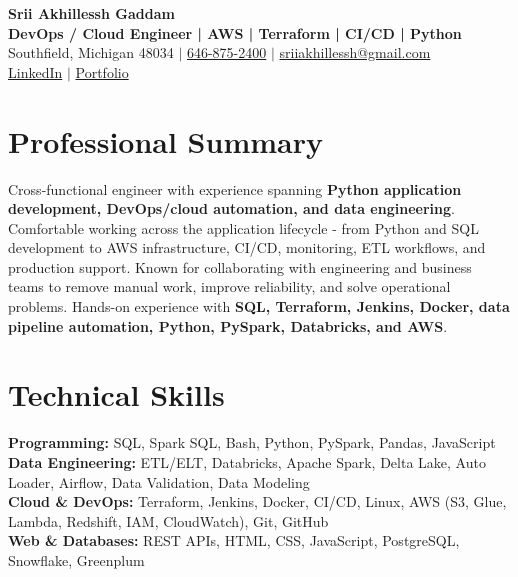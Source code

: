 \documentclass[letterpaper,10pt]{article}
\begin{document}
\fontsize{9.35pt}{10.45pt}\selectfont

\begin{center}
    {\LARGE \textbf{Srii Akhillessh Gaddam}} \\[-1pt]
    \textbf{DevOps / Cloud Engineer | AWS | Terraform | CI/CD | Python} \\[2pt]
    Southfield, Michigan 48034 $|$
    \href{tel:6468752400}{646-875-2400} $|$
    \href{mailto:sriiakhillessh@gmail.com}{sriiakhillessh@gmail.com} \\[1pt]
    \href{https://www.linkedin.com/in/srii-akhiilessh-gaddam-b48668191/}{LinkedIn} $|$
    \href{https://sriiakhillesshg.github.io/portfolio/}{Portfolio}
\end{center}
\vspace{-8pt}

\section{Professional Summary}
\small{Cross-functional engineer with experience spanning \textbf{Python application development, DevOps/cloud automation, and data engineering}. Comfortable working across the application lifecycle - from Python and SQL development to AWS infrastructure, CI/CD, monitoring, ETL workflows, and production support. Known for collaborating with engineering and business teams to remove manual work, improve reliability, and solve operational problems. Hands-on experience with \textbf{SQL, Terraform, Jenkins, Docker, data pipeline automation, Python, PySpark, Databricks, and AWS}.}

\section{Technical Skills}
\small{
\textbf{Programming:} SQL, Spark SQL, Bash, Python, PySpark, Pandas, JavaScript \\
\textbf{Data Engineering:} ETL/ELT, Databricks, Apache Spark, Delta Lake, Auto Loader, Airflow, Data Validation, Data Modeling \\
\textbf{Cloud \& DevOps:} Terraform, Jenkins, Docker, CI/CD, Linux, AWS (S3, Glue, Lambda, Redshift, IAM, CloudWatch), Git, GitHub \\
\textbf{Web \& Databases:} REST APIs, HTML, CSS, JavaScript, PostgreSQL, Snowflake, Greenplum
}
\end{document}
